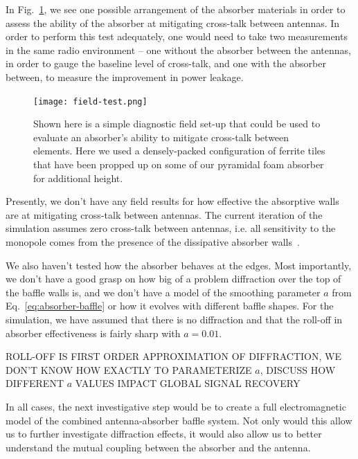 In Fig.~\ref{fig:field-test}, we see one possible arrangement of the absorber 
materials in order to assess the ability of the absorber at mitigating 
cross-talk between antennas. In order to perform this test adequately, one 
would need to take two measurements in the same radio environment -- one 
without the absorber between the antennas, in order to gauge the baseline level 
of cross-talk, and one with the absorber between, to measure the improvement in 
power leakage.

\begin{figure}
    \begin{center}
    \texttt{[image: field-test.png]}
    \end{center}
    \caption{
        Shown here is a simple diagnostic field set-up that could be used to 
        evaluate an absorber's ability to mitigate cross-talk between elements.  
        Here we used a densely-packed configuration of ferrite tiles that have 
        been propped up on some of our pyramidal foam absorber for additional 
        height.
    }
    \label{fig:field-test}
\end{figure}

Presently, we don't have any field results for how effective the absorptive 
walls are at mitigating cross-talk between antennas. The current iteration of 
the simulation assumes zero cross-talk between antennas, i.e. all sensitivity 
to the monopole comes from the presence of the dissipative absorber 
walls~\citep{venumadhav2016}.

We also haven't tested how the absorber behaves at the edges. Most importantly, 
we don't have a good grasp on how big of a problem diffraction over the top of 
the baffle walls is, and we don't have a model of the smoothing parameter $a$ 
from Eq.~\eqref{eq:absorber-baffle} or how it evolves with different baffle 
shapes. For the simulation, we have assumed that there is no diffraction and 
that the roll-off in absorber effectiveness is fairly sharp with $a = 0.01$.

ROLL-OFF IS FIRST ORDER APPROXIMATION OF DIFFRACTION, WE DON'T KNOW HOW EXACTLY 
TO PARAMETERIZE $a$, DISCUSS HOW DIFFERENT $a$ VALUES IMPACT GLOBAL SIGNAL 
RECOVERY



In all cases, the next investigative step would be to create a full 
electromagnetic model of the combined antenna-absorber baffle system. Not only 
would this allow us to further investigate diffraction effects, it would also 
allow us to better understand the mutual coupling between the absorber and the 
antenna.

